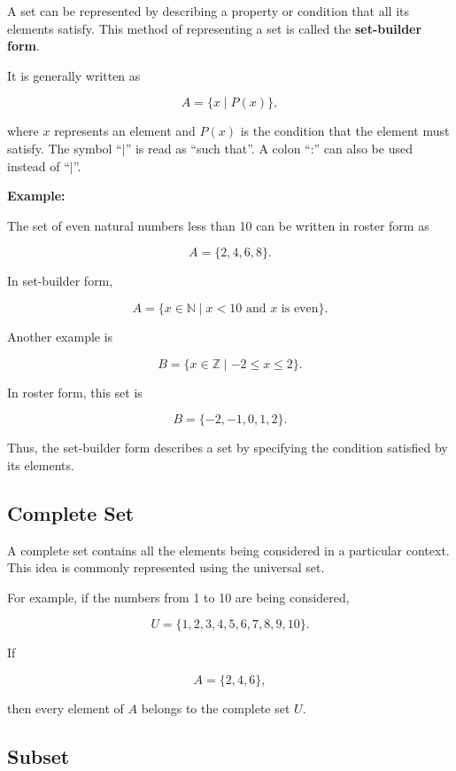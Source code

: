 \documentclass[12pt,a4paper]{article}
\begin{document}
A set can be represented by describing a property or condition that all
its elements satisfy. This method of representing a set is called the
\textbf{set-builder form}.

It is generally written as

\[
A=\{x\mid P(x)\},
\]

where $x$ represents an element and $P(x)$ is the condition that the
element must satisfy. The symbol ``$\mid$'' is read as ``such that''.
A colon ``:'' can also be used instead of ``$\mid$''.

\textbf{Example:}

The set of even natural numbers less than 10 can be written in roster
form as

\[
A=\{2,4,6,8\}.
\]

In set-builder form,

\[
A=\{x\in\mathbb{N}\mid x<10\text{ and }x\text{ is even}\}.
\]

Another example is

\[
B=\{x\in\mathbb{Z}\mid -2\leq x\leq2\}.
\]

In roster form, this set is

\[
B=\{-2,-1,0,1,2\}.
\]

Thus, the set-builder form describes a set by specifying the condition
satisfied by its elements.


\subsection{Complete Set}

A complete set contains all the elements being considered in a particular
context. This idea is commonly represented using the universal set.

For example, if the numbers from 1 to 10 are being considered,

\[
U=\{1,2,3,4,5,6,7,8,9,10\}.
\]

If

\[
A=\{2,4,6\},
\]

then every element of $A$ belongs to the complete set $U$.


\subsection{Subset}
\end{document}
